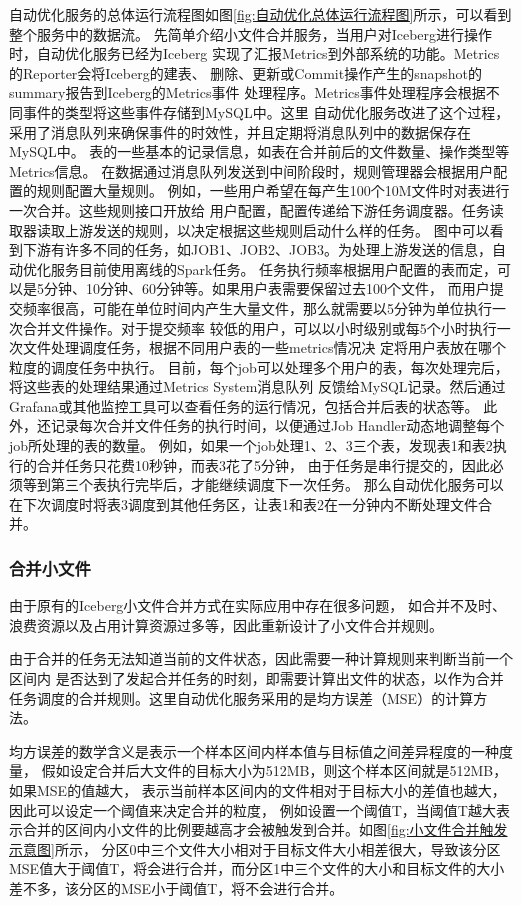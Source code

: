 自动优化服务的总体运行流程图如图\ref{fig:自动优化总体运行流程图}所示，可以看到整个服务中的数据流。
先简单介绍小文件合并服务，当用户对Iceberg进行操作时，自动优化服务已经为Iceberg
实现了汇报Metrics到外部系统的功能。Metrics的Reporter会将Iceberg的建表、
删除、更新或Commit操作产生的snapshot的summary报告到Iceberg的Metrics事件
处理程序。Metrics事件处理程序会根据不同事件的类型将这些事件存储到MySQL中。这里
自动优化服务改进了这个过程，采用了消息队列来确保事件的时效性，并且定期将消息队列中的数据保存在MySQL中。
表的一些基本的记录信息，如表在合并前后的文件数量、操作类型等Metrics信息。
在数据通过消息队列发送到中间阶段时，规则管理器会根据用户配置的规则配置大量规则。
例如，一些用户希望在每产生100个10M文件时对表进行一次合并。这些规则接口开放给
用户配置，配置传递给下游任务调度器。任务读取器读取上游发送的规则，以决定根据这些规则启动什么样的任务。
图中可以看到下游有许多不同的任务，如JOB1、JOB2、JOB3。为处理上游发送的信息，自动优化服务目前使用离线的Spark任务。
任务执行频率根据用户配置的表而定，可以是5分钟、10分钟、60分钟等。如果用户表需要保留过去100个文件，
而用户提交频率很高，可能在单位时间内产生大量文件，那么就需要以5分钟为单位执行一次合并文件操作。对于提交频率
较低的用户，可以以小时级别或每5个小时执行一次文件处理调度任务，根据不同用户表的一些metrics情况决
定将用户表放在哪个粒度的调度任务中执行。
目前，每个job可以处理多个用户的表，每次处理完后，将这些表的处理结果通过Metrics System消息队列
反馈给MySQL记录。然后通过Grafana或其他监控工具可以查看任务的运行情况，包括合并后表的状态等。
此外，还记录每次合并文件任务的执行时间，以便通过Job Handler动态地调整每个job所处理的表的数量。
例如，如果一个job处理1、2、3三个表，发现表1和表2执行的合并任务只花费10秒钟，而表3花了5分钟，
由于任务是串行提交的，因此必须等到第三个表执行完毕后，才能继续调度下一次任务。
那么自动优化服务可以在下次调度时将表3调度到其他任务区，让表1和表2在一分钟内不断处理文件合并。

\subsubsection{合并小文件}

由于原有的Iceberg小文件合并方式在实际应用中存在很多问题，
如合并不及时、浪费资源以及占用计算资源过多等，因此重新设计了小文件合并规则。

由于合并的任务无法知道当前的文件状态，因此需要一种计算规则来判断当前一个区间内
是否达到了发起合并任务的时刻，即需要计算出文件的状态，以作为合并任务调度的合并规则。这里自动优化服务采用的是均方误差（MSE）的计算方法。

均方误差的数学含义是表示一个样本区间内样本值与目标值之间差异程度的一种度量，
假如设定合并后大文件的目标大小为512MB，则这个样本区间就是512MB，如果MSE的值越大，
表示当前样本区间内的文件相对于目标大小的差值也越大，因此可以设定一个阈值来决定合并的粒度，
例如设置一个阈值T，当阈值T越大表示合并的区间内小文件的比例要越高才会被触发到合并。如图\ref{fig:小文件合并触发示意图}所示，
分区0中三个文件大小相对于目标文件大小相差很大，导致该分区MSE值大于阈值T，将会进行合并，而分区1中三个文件的大小和目标文件的大小
差不多，该分区的MSE小于阈值T，将不会进行合并。

